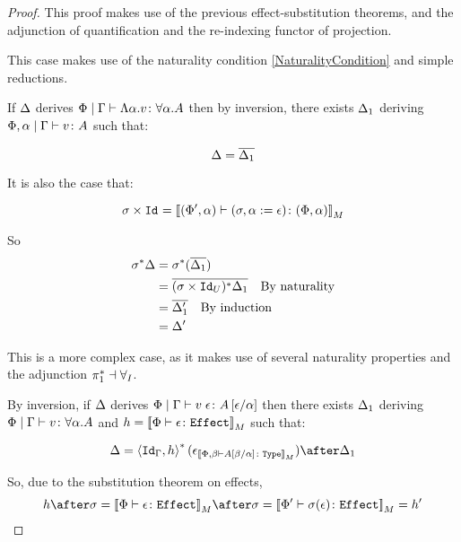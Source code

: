 \documentclass{Report}
\begin{document}
\begin{proof}
    This proof makes use of the previous effect-substitution theorems, and the adjunction of quantification and the re-indexing functor of projection.



This case makes use of the naturality condition \ref{NaturalityCondition} and simple reductions.

If $\Delta$ derives $\Phi\mid\Gamma \vdash \Lambda \alpha. v \colon \forall \alpha. A$ then by inversion, there exists $\Delta_1$ deriving  $\Phi,\alpha\mid\Gamma \vdash v \colon A$ such that:

\begin{equation}
    \Delta = \overline{\Delta_1}\\
\end{equation}

It is also the case that:

\begin{equation}
    \sigma\times\texttt{Id}_{} = {\bf [\![}(\Phi',\alpha) \vdash (\sigma, \alpha:=\epsilon) \colon (\Phi,\alpha){\bf ]\!]}_M
\end{equation}

So
\begin{align}
    \sigma^*\Delta &= \sigma^*(\overline{\Delta_1})\\
    & = \overline{(\sigma\times\texttt{Id}_{U})^*\Delta_1}\quad\text{By naturality}\\
    & = \overline{\Delta_1'}\quad\text{By induction}\\
    & = \Delta'
\end{align}


This is a more complex case, as it makes use of several naturality properties and the adjunction $\pi_1^*\dashv\forall_I$.



By inversion, if $\Delta$ derives $\Phi\mid\Gamma \vdash v\;\epsilon \colon A\left[\epsilon / \alpha\right]$ then there exists $\Delta_1$ deriving $\Phi\mid\Gamma \vdash v \colon \forall \alpha. A$ and $h = {\bf [\![}\Phi \vdash \epsilon \colon \texttt{Effect}{\bf ]\!]}_M$ such that:

\begin{equation}
    \D = \pr{\Id{\G}}{h}\star(\e_{\deno{\typerelation{\P,\b}{A\ssub{\a}{\b}}{\type}}})\after\D_1\\
\end{equation}

So, due to the substitution theorem on effects,
\begin{equation}
    h\after\si = \deno{\typerelation{\P}{\e}{\effect}}\after\si = \deno{\typerelation{\P'}{\si(\e)}{\effect}} = h'
\end{equation}


\end{proof}
\end{document}
